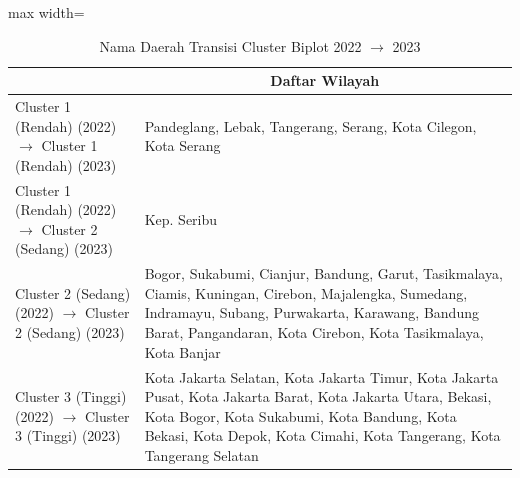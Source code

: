 \begin{table}[H]
\centering
\caption{Nama Daerah Transisi Cluster Biplot 2022 \(\rightarrow\) 2023} \label{tab:app1biplot_trans_name_2022x2023}
\begin{adjustbox}{max width=\textwidth}
\begin{tabular}{|>{\centering\arraybackslash}p{4cm}|p{10cm}|}
\hline
\multicolumn{1}{|c|}{\textbf{Kategori}} & \multicolumn{1}{c|}{\textbf{Daftar Wilayah}} \\
\hline
Cluster 1 (Rendah) (2022) \(\rightarrow\) Cluster 1 (Rendah) (2023) & Pandeglang, Lebak, Tangerang, Serang, Kota Cilegon, Kota Serang \\
\hline
Cluster 1 (Rendah) (2022) \(\rightarrow\) Cluster 2 (Sedang) (2023) & Kep. Seribu \\
\hline
Cluster 2 (Sedang) (2022) \(\rightarrow\) Cluster 2 (Sedang) (2023) & Bogor, Sukabumi, Cianjur, Bandung, Garut, Tasikmalaya, Ciamis, Kuningan, Cirebon, Majalengka, Sumedang, Indramayu, Subang, Purwakarta, Karawang, Bandung Barat, Pangandaran, Kota Cirebon, Kota Tasikmalaya, Kota Banjar \\
\hline
Cluster 3 (Tinggi) (2022) \(\rightarrow\) Cluster 3 (Tinggi) (2023) & Kota Jakarta Selatan, Kota Jakarta Timur, Kota Jakarta Pusat, Kota Jakarta Barat, Kota Jakarta Utara, Bekasi, Kota Bogor, Kota Sukabumi, Kota Bandung, Kota Bekasi, Kota Depok, Kota Cimahi, Kota Tangerang, Kota Tangerang Selatan \\
\hline
\end{tabular}
\end{adjustbox}
\end{table}